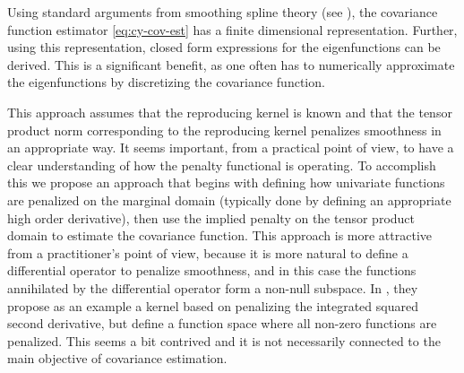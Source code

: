 Using standard arguments from smoothing spline theory (see \cite{Wahba:1990}), the covariance function estimator \eqref{eq:cy-cov-est} has a finite dimensional representation. Further, using this representation, closed form expressions for the eigenfunctions can be derived. This is a significant benefit, as one often has to numerically approximate the eigenfunctions by discretizing the covariance function.

This approach assumes that the reproducing kernel is known and that the tensor product norm corresponding to the reproducing kernel penalizes smoothness in an appropriate way. It seems important, from a practical point of view, to have a clear understanding of how the penalty functional is operating. To accomplish this we propose an approach that begins with defining how univariate functions are penalized on the marginal domain (typically done by defining an appropriate high order derivative), then use the implied penalty on the tensor product domain to estimate the covariance function. This approach is more attractive from a practitioner's point of view, because it is more natural to define a differential operator to penalize smoothness, and in this case the functions annihilated by the differential operator form a non-null subspace. In \cite{Cai:2010vr}, they propose as an example a kernel based on penalizing the integrated squared second derivative, but define a function space where all non-zero functions are penalized. This seems a bit contrived and it is not necessarily connected to the main objective of covariance estimation.

